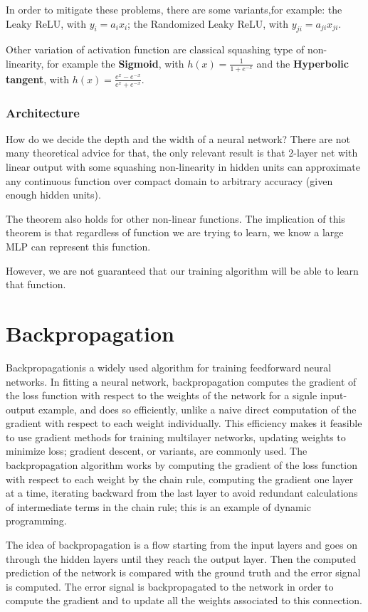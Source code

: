 In order to mitigate these problems, there are some variants,for example: the Leaky ReLU, with \(y_i = a_ix_i\); the Randomized Leaky ReLU, with \(y_{ji} = a_{ji}x_{ji}\). 

Other variation of activation function are classical squashing type of non-linearity, for example the \textbf{Sigmoid}, with \(h(x) = \frac 1 {1 + e^{-x}}\) and the \textbf{Hyperbolic tangent}, with \(h(x) = \frac {e^x - e^{-x}} {e^x + e^{-x}}\).

\subsubsection{Architecture}
How do we decide the depth and the width of a neural network? There are not many theoretical advice for that, the only relevant result is that 2-layer net with linear output with some squashing non-linearity in hidden units can approximate any continuous function over compact domain to arbitrary accuracy (given enough hidden units).

The theorem also holds for other non-linear functions. The implication of this theorem is that regardless of function we are trying to learn, we know a large MLP can represent this function.

However, we are not guaranteed that our training algorithm will be able to learn that function.

\section{Backpropagation}
Backpropagationis a widely used algorithm for training feedforward neural networks. In fitting a neural network, backpropagation computes the gradient of the loss function with respect to the weights of the network for a signle input-output example, and does so efficiently, unlike a naive direct computation of the gradient with respect to each weight individually. This efficiency makes it feasible to use gradient methods for training multilayer networks, updating weights to minimize loss; gradient descent, or variants, are commonly used. The backpropagation algorithm works by computing the gradient of the loss function with respect to each weight by the chain rule, computing the gradient one layer at a time, iterating backward from the last layer to avoid redundant calculations of intermediate terms in the chain rule; this is an example of dynamic programming.

The idea of backpropagation is a flow starting from the input layers and goes on through the hidden layers until they reach the output layer. Then the computed prediction of the network is compared with the ground truth and the error signal is computed. The error signal is backpropagated to the network in order to compute the gradient and to update all the weights associated to this connection.

